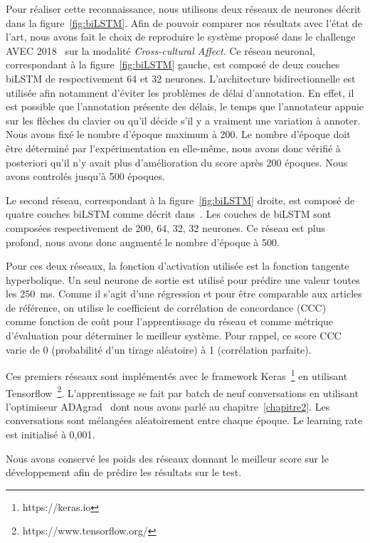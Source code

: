 Pour réaliser cette reconnaissance, nous utilisons deux réseaux de neurones décrit dans la figure~\ref{fig:biLSTM}. Afin de pouvoir comparer nos résultats avec l'état de l'art, nous avons fait le choix de reproduire le système proposé dans le challenge AVEC 2018~\cite{AVEC2018} sur la modalité \textit{Cross-cultural Affect}. Ce réseau neuronal, correspondant à la figure~\ref{fig:biLSTM} gauche, est composé de deux couches biLSTM de respectivement 64 et 32 neurones. L'architecture bidirectionnelle est utilisée afin notamment d'éviter les problèmes de délai d'annotation. En effet, il est possible que l'annotation présente des délais, le temps que l'annotateur appuie sur les flèches du clavier ou qu'il décide s'il y a vraiment une variation à annoter. Nous avons fixé le nombre d'époque maximum à 200. Le nombre d'époque doit être déterminé par l'expérimentation en elle-même, nous avons donc vérifié à posteriori qu'il n'y avait plus d'amélioration du score après 200 époques. Nous avons controlés jusqu'à 500 époques.

Le second réseau, correspondant à la figure~\ref{fig:biLSTM} droite, est composé de quatre couches biLSTM comme décrit dans~\cite{Schmitt2019}. Les couches de biLSTM sont composées respectivement de 200, 64, 32, 32 neurones. Ce réseau est plus profond, nous avons donc augmenté le nombre d'époque à 500.

Pour ces deux réseaux, la fonction d'activation utilisée est la fonction tangente hyperbolique. Un seul neurone de sortie est utilisé pour prédire une valeur toutes les 250~ms. Comme il s'agit d'une régression et pour être comparable aux articles de référence, on utilise le coefficient de corrélation de concordance (CCC)~\cite{CCC} comme fonction de coût pour l'apprentissage du réseau et comme métrique d'évaluation pour déterminer le meilleur système.
Pour rappel, ce score CCC varie de 0 (probabilité d'un tirage aléatoire) à 1 (corrélation parfaite).



Ces premiers réseaux sont implémentés avec le framework Keras~\footnote{https://keras.io} en utilisant Tensorflow~\footnote{https://www.tensorflow.org/}. L'apprentissage se fait par batch de neuf conversations en utilisant l'optimiseur ADAgrad~\cite{Duchi2011} dont nous avons parlé au chapitre~\ref{chapitre2}. Les conversations sont mélangées aléatoirement entre chaque époque. Le learning rate est initialisé à 0,001.

Nous avons conservé les poids des réseaux donnant le meilleur score sur le développement afin de prédire les résultats sur le test.


